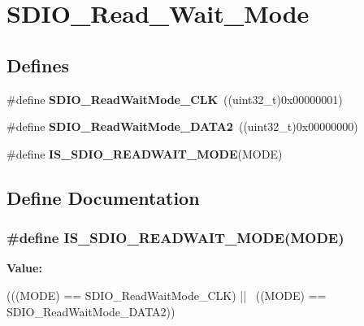\hypertarget{group__SDIO__Read__Wait__Mode}{
\section{SDIO\_\-Read\_\-Wait\_\-Mode}
\label{group__SDIO__Read__Wait__Mode}
}
\subsection*{Defines}
\begin{DoxyCompactItemize}
\item 
\hypertarget{group__SDIO__Read__Wait__Mode_ga5d73b50fed8b2589f337a6301f22f41c}{
\#define {\bfseries SDIO\_\-ReadWaitMode\_\-CLK}~((uint32\_\-t)0x00000001)}
\label{group__SDIO__Read__Wait__Mode_ga5d73b50fed8b2589f337a6301f22f41c}

\item 
\hypertarget{group__SDIO__Read__Wait__Mode_ga3d6952d82468b49dcc7abd5b9e02039f}{
\#define {\bfseries SDIO\_\-ReadWaitMode\_\-DATA2}~((uint32\_\-t)0x00000000)}
\label{group__SDIO__Read__Wait__Mode_ga3d6952d82468b49dcc7abd5b9e02039f}

\item 
\#define {\bfseries IS\_\-SDIO\_\-READWAIT\_\-MODE}(MODE)
\end{DoxyCompactItemize}


\subsection{Define Documentation}
\hypertarget{group__SDIO__Read__Wait__Mode_ga35144093f5b3553a62c2248896eead4d}{
\subsubsection[{IS\_\-SDIO\_\-READWAIT\_\-MODE}]{\setlength{\rightskip}{0pt plus 5cm}\#define IS\_\-SDIO\_\-READWAIT\_\-MODE(MODE)}}
\label{group__SDIO__Read__Wait__Mode_ga35144093f5b3553a62c2248896eead4d}
{\bfseries Value:}
\begin{DoxyCode}
(((MODE) == SDIO_ReadWaitMode_CLK) || \
                                     ((MODE) == SDIO_ReadWaitMode_DATA2))
\end{DoxyCode}
